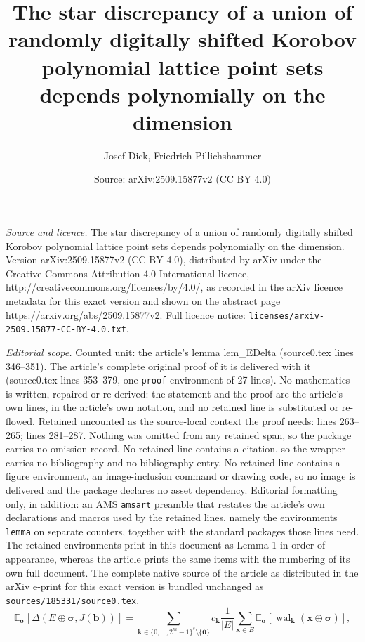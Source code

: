 \documentclass[10pt,a4paper]{amsart}
\title{The star discrepancy of a union of randomly digitally shifted Korobov polynomial lattice point sets depends polynomially on the dimension}
\author{Josef Dick, Friedrich Pillichshammer}
\date{Source: arXiv:2509.15877v2 (CC BY 4.0)}
\begin{document}
\maketitle

\noindent\emph{Source and licence.} The star discrepancy of a union of randomly digitally shifted Korobov polynomial lattice point sets depends polynomially on the dimension. Version arXiv:2509.15877v2 (CC BY 4.0), distributed by arXiv under the Creative Commons Attribution 4.0 International licence, http://creativecommons.org/licenses/by/4.0/, as recorded in the arXiv licence metadata for this exact version and shown on the abstract page https://arxiv.org/abs/2509.15877v2. Full licence notice: \texttt{licenses/arxiv-2509.15877-CC-BY-4.0.txt}.\par\smallskip

\noindent\textit{Editorial scope.} Counted unit: the article's lemma lem\_EDelta (source0.tex lines 346--351). The article's complete original proof of it is delivered with it (source0.tex lines 353--379, one \texttt{proof} environment of 27 lines). No mathematics is written, repaired or re-derived: the statement and the proof are the article's own lines, in the article's own notation, and no retained line is substituted or re-flowed.  Retained uncounted as the source-local context the proof needs: lines 263--265; lines 281--287.  Nothing was omitted from any retained span, so the package carries no omission record.  No retained line contains a citation, so the wrapper carries no bibliography and no bibliography entry.  No retained line contains a figure environment, an image-inclusion command or drawing code, so no image is delivered and the package declares no asset dependency.  Editorial formatting only, in addition: an AMS \texttt{amsart} preamble that restates the article's own declarations and macros used by the retained lines, namely the environments \texttt{lemma} on separate counters, together with the standard packages those lines need.  The retained environments print in this document as Lemma 1 in order of appearance, whereas the article prints the same items with the numbering of its own full document.  The complete native source of the article as distributed in the arXiv e-print for this exact version is bundled unchanged as \texttt{sources/185331/source0.tex}.
\begin{equation}\label{fo:Delta1}
\mathbb{E}_{\bm{\sigma}} [\Delta(E \oplus \bm{\sigma}, J(\bm{b})) ] = \sum_{\bm{k} \in \{0, \ldots, 2^{m}-1\}^s \setminus \{\bm{0}\}}  c_{\bm{k}} \frac{1}{|E|} \sum_{\bm{x} \in E} \mathbb{E}_{\bm{\sigma}} [ \operatorname{wal}_{\bm{k}}(\bm{x} \oplus \bm{\sigma}) ],
\end{equation}
\end{document}
